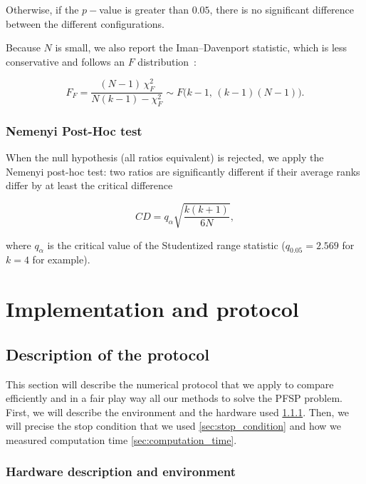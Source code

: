 \documentclass[12pt, openany]{article}
\begin{document}
Otherwise, if the $p-$value is greater than $0.05$, there is no significant difference between the different configurations.

Because $N$ is small, we also report the Iman--Davenport statistic, which is less conservative and follows an $F$ distribution~\cite{iman1980approximations}:

\begin{equation}\label{eq:iman_davenport}
    F_F = \frac{(N-1)\,\chi_F^2}{N(k-1)-\chi_F^2} \sim F\big(k-1,\,(k-1)(N-1)\big).
\end{equation}

\subsubsection{Nemenyi Post-Hoc test}
When the null hypothesis (all ratios equivalent) is rejected, we apply the Nemenyi post-hoc test: two ratios are significantly different if their average ranks differ by at least the critical difference

\begin{equation}\label{eq:nemenyi_cd}
    CD = q_\alpha \sqrt{\frac{k(k+1)}{6N}},
\end{equation}

where $q_\alpha$ is the critical value of the Studentized range statistic ($q_{0.05}=2.569$ for $k=4$ for example).

\section{Implementation and protocol}\label{sec:implementation_protocol}


\subsection{Description of the protocol}

This section will describe the numerical protocol that we apply to compare efficiently and in a fair play way all our methods to solve the PFSP problem. First, we will describe the environment and the hardware used \ref{sec:hardware_environment}. Then, we will precise the stop condition that we used \ref{sec:stop_condition} and how we measured computation time \ref{sec:computation_time}. 

\subsubsection{Hardware description and environment}\label{sec:hardware_environment}
\end{document}

